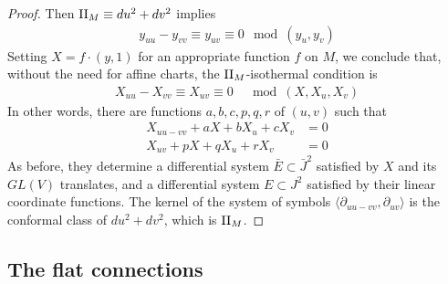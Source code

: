 \documentclass[11pt]{article}
\numberwithin{equation}{section}
\theoremstyle{plain}
\theoremstyle{remark}
\newcommand{\D}{\partial}
\newcommand{\GL}{GL}
\newcommand{\II}{\textnormal{II}}
\begin{document}
\begin{proof}
Then $\II_M\equiv du^{2}+dv^{2}$ implies
\begin{align*}
y_{uu}-y_{vv} \equiv y_{uv} \equiv 0 \mod (y_u,y_v)
\end{align*}
Setting $X=f\cdot(y,1)$ for an appropriate function $f$ on $M$, we conclude that, without the need for affine charts, the $\II_M$-isothermal condition is
\begin{align*}
X_{uu}-X_{vv} \equiv X_{uv} \equiv 0 &\mod (X,X_u,X_v)
\end{align*}
In other words, there are functions $a,b,c,p,q,r$ of $(u,v)$ such that
\begin{equation}\label{ellipticreduction}
\begin{split}
X_{uu-vv} + a X + b X_u + c X_v &=0 \\
X_{uv} +    p X + q X_u + r X_v &=0
\end{split}
\end{equation}
As before, they determine a differential system $\bar{E}\subset \bar{J}^{2}$ satisfied by $X$ and its $\GL(V)$ translates, and a differential system $E\subset J^{2}$ satisfied by their linear coordinate functions. The kernel of the system of symbols $\langle \D_{uu-vv},\D_{uv}\rangle$ is the conformal class of $du^{2}+dv^{2}$, which is $\II_M$.

\end{proof}

\subsection{The flat connections}
\end{document}
